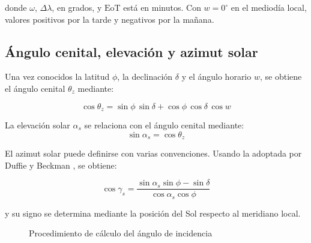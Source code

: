  donde $\omega$, $\Delta \lambda$, en grados, y $\mathrm{EoT}$ está en minutos. Con $w = 0^\circ$ en el mediodía local, valores positivos por la tarde y negativos por la mañana.

\subsection{Ángulo cenital, elevación y azimut solar}

Una vez conocidos la latitud $\phi$, la declinación $\delta$ y el ángulo horario $w$, se obtiene el 
ángulo cenital $\theta_z$ mediante:

\begin{equation}
    \cos\theta_z = \sin\phi\,\sin\delta + \cos\phi\,\cos\delta\,\cos w
\end{equation}

La elevación solar $\alpha_s$ se relaciona con el ángulo cenital mediante:
\begin{equation}
	\sin \alpha_s = \cos \theta_z
\end{equation}


El azimut solar puede definirse con varias convenciones. Usando la adoptada por Duffie y Beckman \cite{duffie2020}, se obtiene:

\begin{equation}
	\cos \gamma_s =
	\frac{\sin \alpha_s \sin \phi - \sin \delta}
	{\cos \alpha_s \cos \phi}
\end{equation}


y su signo se determina mediante la posición del Sol respecto al meridiano local.


\begin{figure}[b]
    \centering  
    
    \caption{Procedimiento de cálculo del ángulo de incidencia}
\end{figure}




